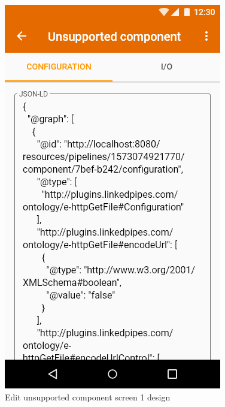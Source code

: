 \begin{figure}\centering
    \begin{minipage}[b]{0.32\textwidth}
    	\includegraphics[width=\textwidth]{pics/xd/Edit unsupported component - configuration.png}
    	\caption[Edit unsupported component screen 1]{Edit unsupported component screen 1 design}\label{fig:xdEditUnsupportedComponent1}
    \end{minipage}
    \begin{minipage}[b]{0.32\textwidth}

\end{minipage}
\end{figure}
